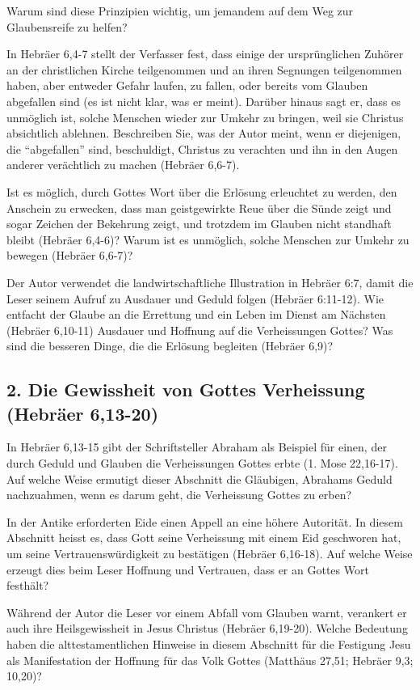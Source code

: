 \documentclass[headsepline=true]{book}
\begin{document}
Warum sind diese Prinzipien wichtig, um jemandem auf dem Weg zur
Glaubensreife zu helfen?

In Hebräer 6,4-7 stellt der Verfasser fest, dass einige der
ursprünglichen Zuhörer an der christlichen Kirche teilgenommen und an
ihren Segnungen teilgenommen haben, aber entweder Gefahr laufen, zu
fallen, oder bereits vom Glauben abgefallen sind (es ist nicht klar, was
er meint). Darüber hinaus sagt er, dass es unmöglich ist, solche
Menschen wieder zur Umkehr zu bringen, weil sie Christus absichtlich
ablehnen. Beschreiben Sie, was der Autor meint, wenn er diejenigen, die
``abgefallen'' sind, beschuldigt, Christus zu verachten und ihn in den
Augen anderer verächtlich zu machen (Hebräer 6,6-7).

Ist es möglich, durch Gottes Wort über die Erlösung erleuchtet zu
werden, den Anschein zu erwecken, dass man geistgewirkte Reue über die
Sünde zeigt und sogar Zeichen der Bekehrung zeigt, und trotzdem im
Glauben nicht standhaft bleibt (Hebräer 6,4-6)? Warum ist es unmöglich,
solche Menschen zur Umkehr zu bewegen (Hebräer 6,6-7)?

Der Autor verwendet die landwirtschaftliche Illustration in Hebräer 6:7,
damit die Leser seinem Aufruf zu Ausdauer und Geduld folgen (Hebräer
6:11-12). Wie entfacht der Glaube an die Errettung und ein Leben im
Dienst am Nächsten (Hebräer 6,10-11) Ausdauer und Hoffnung auf die
Verheissungen Gottes? Was sind die besseren Dinge, die die Erlösung
begleiten (Hebräer 6,9)?

\subsection{2. Die Gewissheit von Gottes Verheissung (Hebräer
6,13-20)}\label{die-gewissheit-von-gottes-verheissung-hebruxe4er-613-20}

In Hebräer 6,13-15 gibt der Schriftsteller Abraham als Beispiel für
einen, der durch Geduld und Glauben die Verheissungen Gottes erbte (1.
Mose 22,16-17). Auf welche Weise ermutigt dieser Abschnitt die
Gläubigen, Abrahams Geduld nachzuahmen, wenn es darum geht, die
Verheissung Gottes zu erben?

In der Antike erforderten Eide einen Appell an eine höhere Autorität. In
diesem Abschnitt heisst es, dass Gott seine Verheissung mit einem Eid
geschworen hat, um seine Vertrauenswürdigkeit zu bestätigen (Hebräer
6,16-18). Auf welche Weise erzeugt dies beim Leser Hoffnung und
Vertrauen, dass er an Gottes Wort festhält?

Während der Autor die Leser vor einem Abfall vom Glauben warnt,
verankert er auch ihre Heilsgewissheit in Jesus Christus (Hebräer
6,19-20). Welche Bedeutung haben die alttestamentlichen Hinweise in
diesem Abschnitt für die Festigung Jesu als Manifestation der Hoffnung
für das Volk Gottes (Matthäus 27,51; Hebräer 9,3; 10,20)?
\end{document}

